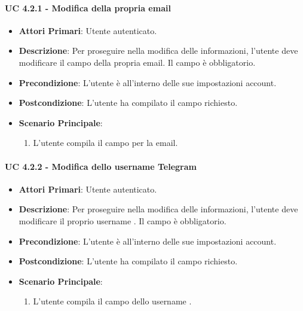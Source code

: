 				\paragraph{UC 4.2.1 - Modifica della propria email}
				\begin{itemize}
					\item \textbf{Attori Primari}: Utente autenticato.
					\item \textbf{Descrizione}: Per proseguire nella modifica delle informazioni, l'utente deve modificare il campo della propria email. Il campo è obbligatorio.
					\item \textbf{Precondizione}: L'utente è all'interno delle sue impostazioni account.
					\item \textbf{Postcondizione}: L'utente ha compilato il campo richiesto.
					\item \textbf{Scenario Principale}:
					\begin{enumerate}
						\item L'utente compila il campo per la email.
					\end{enumerate}
				\end{itemize}

				\paragraph{UC 4.2.2 - Modifica dello username Telegram}
				\begin{itemize}
					\item \textbf{Attori Primari}: Utente autenticato.
					\item \textbf{Descrizione}: Per proseguire nella modifica delle informazioni, l'utente deve modificare il proprio username . Il campo è obbligatorio.
					\item \textbf{Precondizione}: L'utente è all'interno delle sue impostazioni account.
					\item \textbf{Postcondizione}: L'utente ha compilato il campo richiesto.
					\item \textbf{Scenario Principale}:
					\begin{enumerate}
						\item L'utente compila il campo dello username .
					\end{enumerate}
				\end{itemize}

